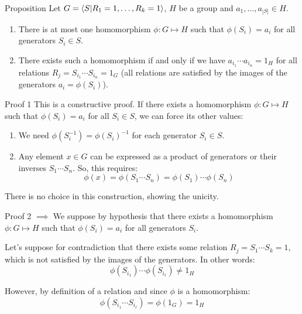 \documentclass[a4paper]{article}
\begin{document}
\begin{parag}{Proposition}
    Let $G = \braket{S}{R_1 = 1, \ldots, R_k = 1}$, $H$ be a group and $a_1, \ldots, a_{\left|S\right|} \in H$. 
    
    \begin{enumerate}
        \item There is at most one homomorphism $\phi: G \mapsto H$ such that $\phi\left(S_i\right) = a_i$ for all generators $S_i \in S$.
        \item There exists such a homomorphism if and only if we have $a_{i_1}\cdots a_{i_n} = 1_H$ for all relations $R_{j} = S_{i_1} \cdots S_{i_n} = 1_G$ (all relations are satisfied by the images of the generators $a_i = \phi\left(S_i\right)$).
    \end{enumerate}
    
    \begin{subparag}{Proof 1}
        This is a constructive proof. If there exists a homomorphism $\phi: G \mapsto H$ such that $\phi\left(S_i\right) = a_i$ for all $S_i \in S$, we can force its other values:
        \begin{enumerate}
            \item We need $\phi\left(S_i^{-1}\right) = \phi\left(S_i\right)^{-1}$ for each generator $S_i \in S$. 
            \item Any element $x \in G$ can be expressed as a product of generators or their inverses $S_1 \cdots S_n$. So, this requires: 
            \[\phi\left(x\right) = \phi\left(S_1 \cdots S_n\right) = \phi\left(S_1\right)\cdots\phi\left(S_n\right)\]
        \end{enumerate}

        There is no choice in this construction, showing the unicity.
    \end{subparag}
    
    \begin{subparag}{Proof 2 $\implies$}
        We suppose by hypothesis that there exists a homomorphism $\phi: G \mapsto H$ such that $\phi\left(S_i\right) = a_i$ for all generators $S_i$.

        Let's suppose for contradiction that there exists some relation $R_j = S_1 \cdots S_k = 1$, which is not satisfied by the images of the generators. In other words:
        \[\phi\left(S_{i_1}\right) \cdots \phi\left(S_{i_\ell }\right) \neq 1_H\]

        However, by definition of a relation and since $\phi$ is a homomorphism:
        \[\phi\left(S_{i_1} \cdots S_{i_\ell }\right) = \phi\left(1_G\right) = 1_H\]


\end{subparag}
\end{parag}
\end{document}
